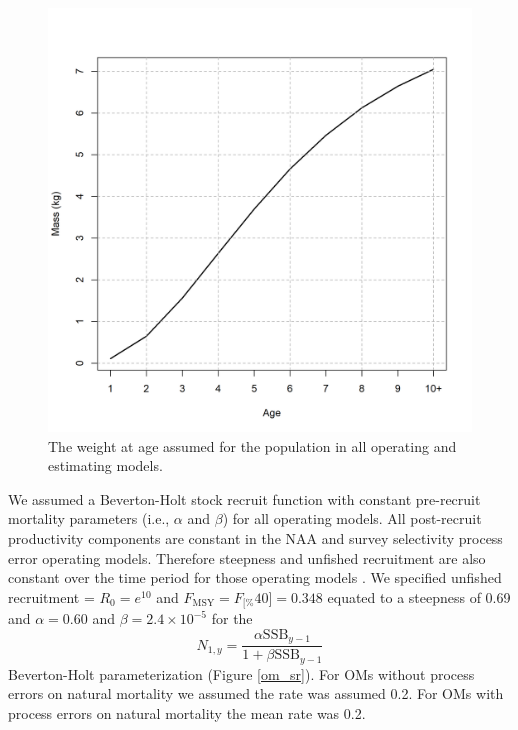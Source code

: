 \documentclass[
  12pt,
]{article}
\newcommand{\Fmsy}{\ensuremath{F_{\text{MSY}}}\xspace}
\newcommand{\Fspr}[1]{\ensuremath{F_{\text{{#1}\%}}}\xspace}
\begin{document}
\begin{figure}
\caption{The weight at age assumed for the population in all operating and estimating models.}\label{om_waa}
\begin{center}
\includegraphics[width = \textwidth]{om_waa.png}
\end{center}
\end{figure}

We assumed a Beverton-Holt stock recruit function with constant
pre-recruit mortality parameters (i.e., \(\alpha\) and \(\beta\)) for
all operating models. All post-recruit productivity components are
constant in the NAA and survey selectivity process error operating
models. Therefore steepness and unfished recruitment are also constant
over the time period for those operating models \citep{millerbrooks21}.
We specified unfished recruitment = \(R_0 = e^{10}\) and
\(\Fmsy = \Fspr[40] = 0.348\) equated to a steepness of 0.69 and
\(\alpha=0.60\) and \(\beta = 2.4 \times 10^{-5}\) for the \[
N_{1,y} = \frac{\alpha \text{SSB}_{y-1}}{1 + \beta \text{SSB}_{y-1}} 
\] Beverton-Holt parameterization (Figure \ref{om_sr}). For OMs without
process errors on natural mortality we assumed the rate was assumed 0.2.
For OMs with process errors on natural mortality the mean rate was 0.2.
\end{document}
